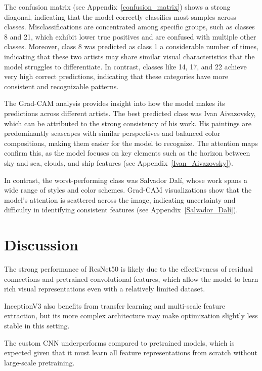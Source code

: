 \documentclass[12pt,a4paper]{article}
\begin{document}
The confusion matrix (see Appendix~\ref{confusion_matrix}) shows a strong diagonal, indicating that the model correctly classifies most samples across classes. 
Misclassifications are concentrated among specific groups, such as classes 8 and 21, which exhibit lower true positives and are confused with multiple other classes.
Moreover, class 8 was predicted as class 1 a considerable number of times, indicating that these two artists may share similar visual characteristics that the model struggles to differentiate.
In contrast, classes like 14, 17, and 22 achieve very high correct predictions, indicating that these categories have more consistent and recognizable patterns. 

The Grad-CAM analysis provides insight into how the model makes its predictions across different artists.
The best predicted class was Ivan Aivazovsky, which can be attributed to the strong consistency of his work. 
His paintings are predominantly seascapes with similar perspectives and balanced color compositions, making them easier for the model to recognize. 
The attention maps confirm this, as the model focuses on key elements such as the horizon between sky and sea, clouds, and ship features (see Appendix~\ref{Ivan_Aivazovsky}).
 
In contrast, the worst-performing class was Salvador Dalí, whose work spans a wide range of styles and color schemes. 
Grad-CAM visualizations show that the model’s attention is scattered across the image, indicating uncertainty and difficulty in identifying consistent features (see Appendix~\ref{Salvador_Dalí}). 



\section{Discussion}

The strong performance of ResNet50 is likely due to the effectiveness of residual connections and pretrained convolutional features, which allow the model to learn rich visual representations even with a relatively limited dataset. 


InceptionV3 also benefits from transfer learning and multi-scale feature extraction, but its more complex architecture may make optimization slightly less stable in this setting.

The custom CNN underperforms compared to pretrained models, which is expected given that it must learn all feature representations from scratch without large-scale pretraining. 
\end{document}

